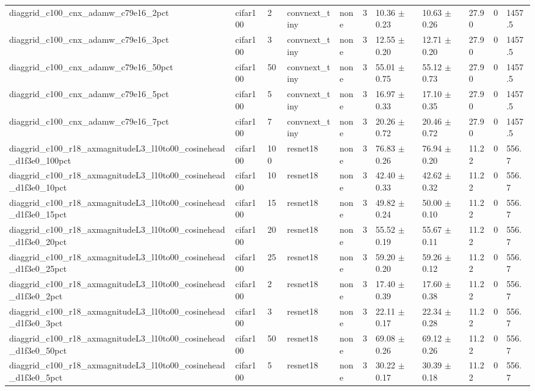 \begin{tabular}{lllllllllll}
diaggrid_c100_cnx_adamw_c79e16_2pct & cifar100 & 2 & convnext_tiny & none & 3 & 10.36 $\pm$ 0.23 & 10.63 $\pm$ 0.26 & 27.90 & 0 & 1457.5 \\
diaggrid_c100_cnx_adamw_c79e16_3pct & cifar100 & 3 & convnext_tiny & none & 3 & 12.55 $\pm$ 0.20 & 12.71 $\pm$ 0.20 & 27.90 & 0 & 1457.5 \\
diaggrid_c100_cnx_adamw_c79e16_50pct & cifar100 & 50 & convnext_tiny & none & 3 & 55.01 $\pm$ 0.75 & 55.12 $\pm$ 0.73 & 27.90 & 0 & 1457.5 \\
diaggrid_c100_cnx_adamw_c79e16_5pct & cifar100 & 5 & convnext_tiny & none & 3 & 16.97 $\pm$ 0.33 & 17.10 $\pm$ 0.35 & 27.90 & 0 & 1457.5 \\
diaggrid_c100_cnx_adamw_c79e16_7pct & cifar100 & 7 & convnext_tiny & none & 3 & 20.26 $\pm$ 0.72 & 20.46 $\pm$ 0.72 & 27.90 & 0 & 1457.5 \\
diaggrid_c100_r18_axmagnitudeL3_l10to00_cosinehead_d1f3e0_100pct & cifar100 & 100 & resnet18 & none & 3 & 76.83 $\pm$ 0.26 & 76.94 $\pm$ 0.20 & 11.22 & 0 & 556.7 \\
diaggrid_c100_r18_axmagnitudeL3_l10to00_cosinehead_d1f3e0_10pct & cifar100 & 10 & resnet18 & none & 3 & 42.40 $\pm$ 0.33 & 42.62 $\pm$ 0.32 & 11.22 & 0 & 556.7 \\
diaggrid_c100_r18_axmagnitudeL3_l10to00_cosinehead_d1f3e0_15pct & cifar100 & 15 & resnet18 & none & 3 & 49.82 $\pm$ 0.24 & 50.00 $\pm$ 0.10 & 11.22 & 0 & 556.7 \\
diaggrid_c100_r18_axmagnitudeL3_l10to00_cosinehead_d1f3e0_20pct & cifar100 & 20 & resnet18 & none & 3 & 55.52 $\pm$ 0.19 & 55.67 $\pm$ 0.11 & 11.22 & 0 & 556.7 \\
diaggrid_c100_r18_axmagnitudeL3_l10to00_cosinehead_d1f3e0_25pct & cifar100 & 25 & resnet18 & none & 3 & 59.20 $\pm$ 0.20 & 59.26 $\pm$ 0.12 & 11.22 & 0 & 556.7 \\
diaggrid_c100_r18_axmagnitudeL3_l10to00_cosinehead_d1f3e0_2pct & cifar100 & 2 & resnet18 & none & 3 & 17.40 $\pm$ 0.39 & 17.60 $\pm$ 0.38 & 11.22 & 0 & 556.7 \\
diaggrid_c100_r18_axmagnitudeL3_l10to00_cosinehead_d1f3e0_3pct & cifar100 & 3 & resnet18 & none & 3 & 22.11 $\pm$ 0.17 & 22.34 $\pm$ 0.28 & 11.22 & 0 & 556.7 \\
diaggrid_c100_r18_axmagnitudeL3_l10to00_cosinehead_d1f3e0_50pct & cifar100 & 50 & resnet18 & none & 3 & 69.08 $\pm$ 0.26 & 69.12 $\pm$ 0.26 & 11.22 & 0 & 556.7 \\
diaggrid_c100_r18_axmagnitudeL3_l10to00_cosinehead_d1f3e0_5pct & cifar100 & 5 & resnet18 & none & 3 & 30.22 $\pm$ 0.17 & 30.39 $\pm$ 0.18 & 11.22 & 0 & 556.7 \\

\end{tabular}
